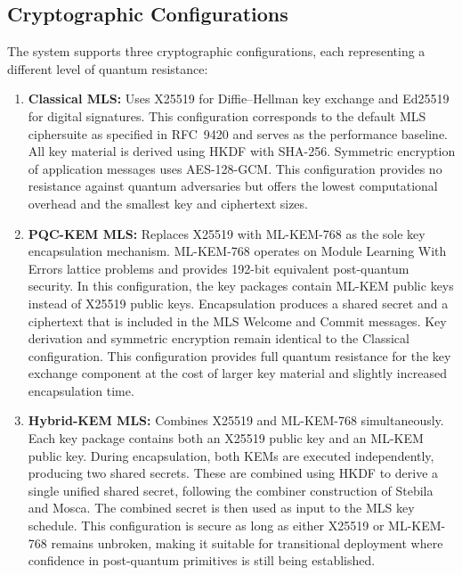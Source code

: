\documentclass{ieeeaccess}
\begin{document}
\subsection{Cryptographic Configurations}

The system supports three cryptographic configurations, each representing a different
level of quantum resistance:

\begin{enumerate}
  \item \textbf{Classical MLS:} Uses X25519 for Diffie--Hellman key exchange and
  Ed25519 for digital signatures. This configuration corresponds to the default
  MLS ciphersuite as specified in RFC~9420 and serves as the performance baseline.
  All key material is derived using HKDF with SHA-256. Symmetric encryption of
  application messages uses AES-128-GCM. This configuration provides no resistance
  against quantum adversaries but offers the lowest computational overhead and the
  smallest key and ciphertext sizes.

  \item \textbf{PQC-KEM MLS:} Replaces X25519 with ML-KEM-768 as the sole key
  encapsulation mechanism. ML-KEM-768 operates on Module Learning With Errors
  lattice problems and provides 192-bit equivalent post-quantum security. In this
 configuration, the key packages contain ML-KEM public keys instead of X25519 public
  keys. Encapsulation produces a shared secret and a ciphertext that is included
  in the MLS Welcome and Commit messages. Key derivation and symmetric encryption
  remain identical to the Classical configuration. This configuration provides full
  quantum resistance for the key exchange component at the cost of larger key
  material and slightly increased encapsulation time.

  \item \textbf{Hybrid-KEM MLS:} Combines X25519 and ML-KEM-768 simultaneously.
  Each key package contains both an X25519 public key and an ML-KEM public key.
  During encapsulation, both KEMs are executed independently, producing two shared
  secrets. These are combined using HKDF to derive a single unified shared secret,
  following the combiner construction of Stebila and Mosca. The combined secret is
  then used as input to the MLS key schedule. This configuration is secure as
  long as either X25519 or ML-KEM-768 remains unbroken, making it suitable for
  transitional deployment where confidence in post-quantum primitives is still
  being established.
\end{enumerate}
\end{document}
